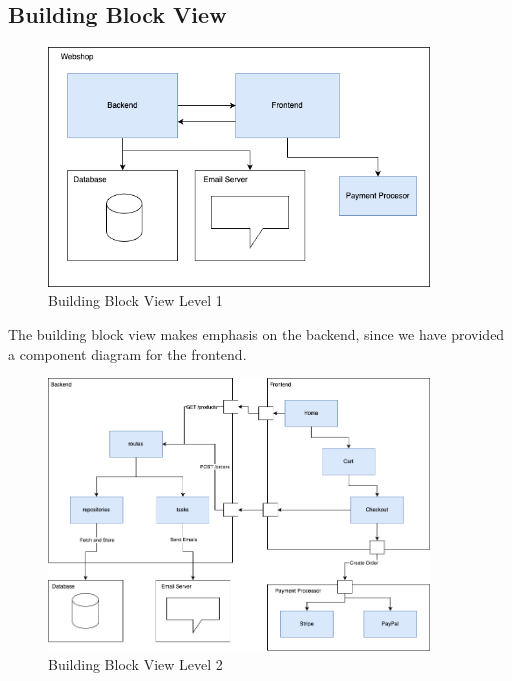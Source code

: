 \documentclass{llncs}
\begin{document}
\subsection{Building Block View}

\begin{figure}[H]
    \begin{center}
        \includegraphics[width=0.9\textwidth]{../diagrams/block_diagram-Level1.drawio.png}
        \vspace{0.01\textwidth}
        \caption{Building Block View Level 1}
        \label{BuildingBlockView1}
    \end{center}
\end{figure}

The building block view makes emphasis on the backend, since we have provided a component diagram for the frontend.\\


\begin{figure}[H]
    \begin{center}
        \includegraphics[width=0.9\textwidth]{../diagrams/block_diagram-Level2.drawio.png}
        \vspace{0.01\textwidth}
        \caption{Building Block View Level 2}
        \label{BuildingBlockView2}
    \end{center}
\end{figure}
\end{document}
